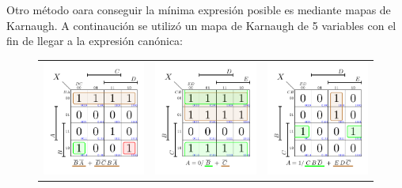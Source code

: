 Otro método oara conseguir la mínima expresión posible es mediante mapas de Karnaugh. A continaución se utilizó un mapa de Karnaugh de 5 variables con el fin de llegar a la expresión canónica:
\begin{figure}[H]
   \centering
\begin{tabular}{ccc}
	\includegraphics[width=4cm,trim={0.25cm 0.5cm  0.25cm 0.25cm},clip]{Ejercicio_2/Karnaugh/K1.pdf}& \hspace{3ex} 
	\includegraphics[width=4cm,trim={0.25cm 0.5cm  0.25cm 0.25cm},clip]{Ejercicio_2/Karnaugh/K2.pdf}&
	\includegraphics[width=4cm,trim={0.25cm 0.5cm  0.25cm 0.25cm},clip]{Ejercicio_2/Karnaugh/K3.pdf}\\
	\end{tabular}
    \label{fig:Karnaughs_encoder} %
\end{figure}

 


